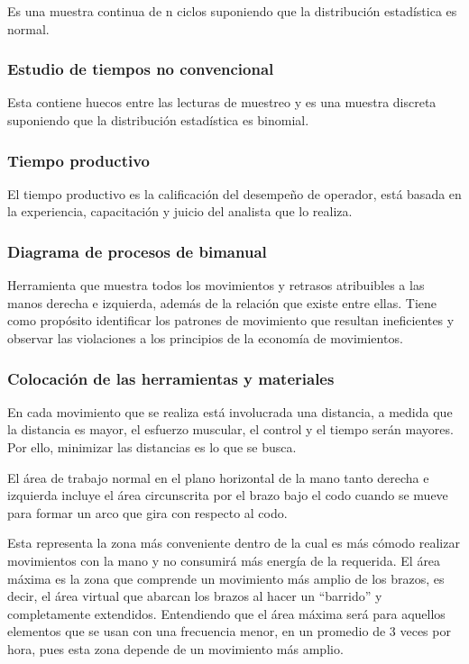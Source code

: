 Es una muestra continua de n ciclos suponiendo que la distribución estadística es normal.

\subsubsection{Estudio de tiempos no convencional}

Esta contiene huecos entre las lecturas de muestreo y es una muestra discreta suponiendo que la distribución estadística es binomial.

\subsubsection{Tiempo productivo}

El tiempo productivo es la calificación del desempeño de operador, está basada en la experiencia, capacitación y juicio del analista que lo realiza.

\subsubsection{Diagrama de procesos de bimanual}

Herramienta que muestra todos los movimientos y retrasos atribuibles a las manos derecha e izquierda, además de la relación que existe entre ellas. 
Tiene como propósito identificar los patrones de movimiento que resultan ineficientes y observar las violaciones a los principios de la economía de movimientos.\cite{niebel1980ingenieria}

\subsubsection{Colocación de las herramientas y materiales}

En cada movimiento que se realiza está involucrada una distancia, a medida que la distancia es mayor, el esfuerzo muscular, el control y el tiempo serán mayores. Por ello, minimizar las distancias es lo que se busca.

El área de trabajo normal en el plano horizontal de la mano tanto derecha e izquierda incluye el área circunscrita por el brazo bajo el codo cuando se mueve para formar un arco que gira con respecto al codo.

Esta representa la zona más conveniente dentro de la cual es más cómodo realizar movimientos con la mano y no consumirá más energía de la requerida. El área máxima es la zona que  comprende un movimiento más amplio de los brazos, es decir, el área virtual que abarcan los brazos al hacer un “barrido” y completamente extendidos. Entendiendo que el área máxima será para aquellos elementos que se usan con una frecuencia menor, en un promedio de 3 veces por hora, pues esta zona depende de un movimiento más amplio. \cite{niebel1980ingenieria}

